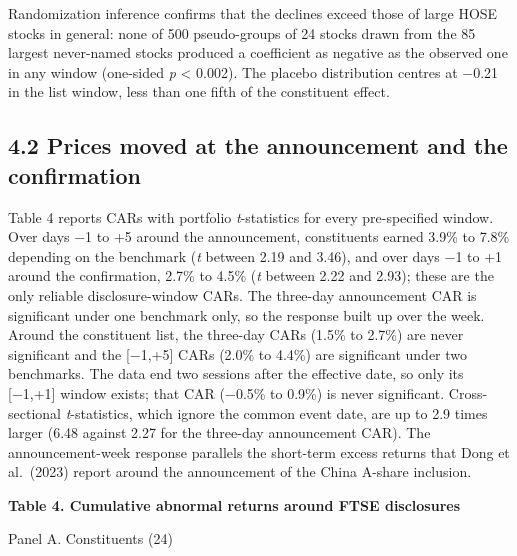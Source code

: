 \documentclass[review,authoryear,12pt]{elsarticle}
\begin{document}
Randomization inference confirms that the declines exceed those of large
HOSE stocks in general: none of 500 pseudo-groups of 24 stocks drawn
from the 85 largest never-named stocks produced a coefficient as
negative as the observed one in any window (one-sided \emph{p}
\textless{} 0.002). The placebo distribution centres at −0.21 in the
list window, less than one fifth of the constituent effect.

\hypertarget{prices-moved-at-the-announcement-and-the-confirmation}{%
\subsection*{4.2 Prices moved at the announcement and the
confirmation}}

Table 4 reports CARs with portfolio \emph{t}-statistics for every
pre-specified window. Over days −1 to +5 around the announcement,
constituents earned 3.9\% to 7.8\% depending on the benchmark (\emph{t}
between 2.19 and 3.46), and over days −1 to +1 around the confirmation,
2.7\% to 4.5\% (\emph{t} between 2.22 and 2.93); these are the only
reliable disclosure-window CARs. The three-day announcement CAR is
significant under one benchmark only, so the response built up over the
week. Around the constituent list, the three-day CARs (1.5\% to 2.7\%)
are never significant and the {[}−1,+5{]} CARs (2.0\% to 4.4\%) are
significant under two benchmarks. The data end two sessions after the
effective date, so only its {[}−1,+1{]} window exists; that CAR (−0.5\%
to 0.9\%) is never significant. Cross-sectional \emph{t}-statistics,
which ignore the common event date, are up to 2.9 times larger (6.48
against 2.27 for the three-day announcement CAR). The announcement-week
response parallels the short-term excess returns that Dong et al.~(2023)
report around the announcement of the China A-share inclusion.

\textbf{Table 4. Cumulative abnormal returns around FTSE disclosures}

Panel A. Constituents (24)
\end{document}
